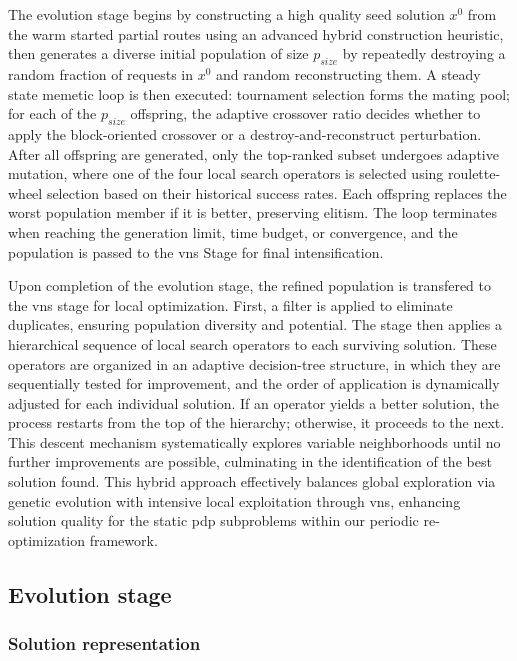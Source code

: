 \documentclass[preprint,12pt]{elsarticle}
\begin{document}
The evolution stage begins by constructing a high quality seed solution \(x^0\) from the warm started partial routes using an advanced hybrid construction heuristic, then generates a diverse initial population of size \(p_{size}\) by repeatedly destroying a random fraction of requests in \(x^0\) and random reconstructing them. A steady state memetic loop is then executed: tournament selection forms the mating pool; for each of the \(p_{size}\) offspring, the adaptive crossover ratio decides whether to apply the block-oriented crossover or a destroy-and-reconstruct perturbation. After all offspring are generated, only the top-ranked subset undergoes adaptive mutation, where one of the four local search operators is selected using roulette-wheel selection based on their historical success rates. Each offspring replaces the worst population member if it is better, preserving elitism. The loop terminates when reaching the generation limit, time budget, or convergence, and the population is passed to the \gls{vns} Stage for final intensification.

Upon completion of the evolution stage, the refined population is transfered to the \gls{vns} stage for local optimization. First, a filter is applied to eliminate duplicates, ensuring population diversity and potential. The stage then applies a hierarchical sequence of local search operators to each surviving solution. These operators are organized in an adaptive decision-tree structure, in which they are sequentially tested for improvement, and the order of application is dynamically adjusted for each individual solution. If an operator yields a better solution, the process restarts from the top of the hierarchy; otherwise, it proceeds to the next. This descent mechanism systematically explores variable neighborhoods until no further improvements are possible, culminating in the identification of the best solution found. This hybrid approach effectively balances global exploration via genetic evolution with intensive local exploitation through \gls{vns}, enhancing solution quality for the static \gls{pdp} subproblems within our periodic re-optimization framework.

\subsection{Evolution stage}
\subsubsection{Solution representation}
\end{document}
